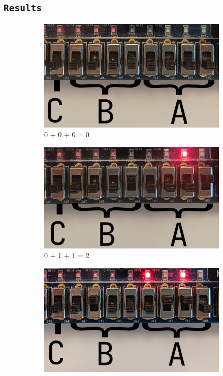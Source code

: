 \documentclass{article}
\let\oldsubsection\subsection
\renewcommand{\subsection}[1]{%
  \oldsubsection{\texttt{#1}}%
  \setcounter{subsubsection}{-1}%
}
\begin{document}
\clearpage
\subsection{Results}
\begin{figure}[h]
    \centering
    \begin{subfigure}{0.4\textwidth}
        \centering
        \includegraphics[width=1\textwidth]{Figures/Part3-0_0_0.jpg}
        \caption{0 + 0 + 0 = 0}
        \label{fig:T03pic1}
    \end{subfigure}
    \hfill
    \begin{subfigure}{0.4\textwidth}
        \centering
        \includegraphics[width=1\textwidth]{Figures/Part3-0_1_1.jpg}
        \caption{0 + 1 + 1 = 2}
        \label{fig:T03pic2}
    \end{subfigure}
    \begin{subfigure}{0.4\textwidth}
        \centering
        \includegraphics[width=1\textwidth]{Figures/Part3-0_4_6.jpg}

\end{subfigure}
\end{figure}
\end{document}
